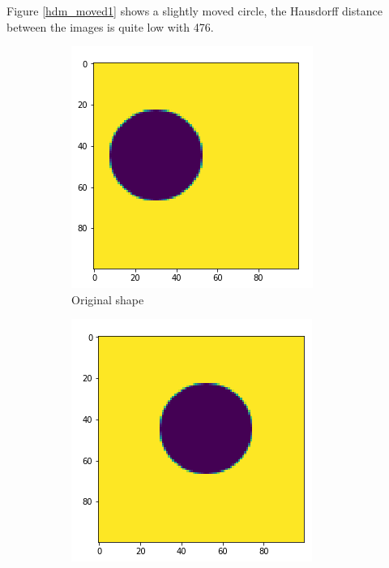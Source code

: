 Figure \ref{hdm_moved1} shows a slightly moved circle, the Hausdorff distance between the images is quite low with 476.

\begin{figure}[H]
    \centering
    \begin{subfigure}{.35\textwidth}
        \centering
        \includegraphics[width=\linewidth]{chapters/06_hdm/images/hdm_original.png}
        \caption{Original shape}
    \end{subfigure}%
    \begin{subfigure}{.35\textwidth}
        \centering
        \includegraphics[width=\linewidth]{chapters/06_hdm/images/hdm_moved2.png}

\end{subfigure}
\end{figure}
